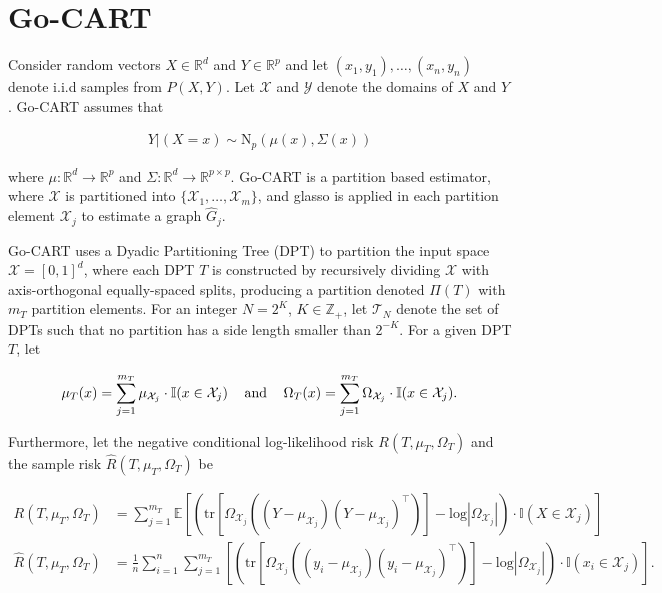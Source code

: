 \documentclass[12pt]{article}
\begin{document}
\section{Go-CART}

Consider random vectors $X \in \mathbb{R}^d$ and $Y \in \mathbb{R}^p$
and let $(x_1,y_1),\ldots,(x_n,y_n)$ denote i.i.d samples from
$P(X,Y)$. Let $\mathcal{X}$ and $\mathcal{Y}$ denote the domains of
$X$ and $Y$. Go-CART assumes that

\begin{align}
    Y|(X=x) \sim \text{N}_p(\mu(x),\Sigma(x))
\end{align}

where $\mu:\mathbb{R}^d \rightarrow \mathbb{R}^p$ and
$\Sigma:\mathbb{R}^d \rightarrow \mathbb{R}^{p \times p}$. Go-CART is
a partition based estimator, where $\mathcal{X}$ is partitioned into
$\{ \mathcal{X}_1,\ldots,\mathcal{X}_m \}$, and glasso is applied in
each partition element $\mathcal{X}_j$ to estimate a graph
$\hat{G}_j$.

Go-CART uses a Dyadic Partitioning Tree (DPT) to partition the input
space $\mathcal{X} = [0,1]^d$, where each DPT $T$ is constructed by
recursively dividing $\mathcal{X}$ with axis-orthogonal equally-spaced
splits, producing a partition denoted $\Pi(T)$ with $m_T$ partition
elements. For an integer $N=2^K$, $K \in \mathbb{Z}_+$, let
$\mathcal{T}_N$ denote the set of DPTs such that no partition has a
side length smaller than $2^{-K}$. For a given DPT $T$, let

\begin{align}
    \mu_T(x) = \sum_{j=1}^{m_T} \mu_{\mathcal{X}_j} \cdot \mathbb{I}(x \in \mathcal{X}_j)
    \hspace{3mm} \text{ and } \hspace{3mm}
    \Omega_T(x) = \sum_{j=1}^{m_T} \Omega_{\mathcal{X}_j} \cdot \mathbb{I}(x \in \mathcal{X}_j).
\end{align}

Furthermore, let the negative conditional log-likelihood risk
$R(T,\mu_T,\Omega_T)$ and the sample risk $\hat{R}(T,\mu_T,\Omega_T)$
be

\begin{align}
    R(T,\mu_T,\Omega_T) &= \sum_{j=1}^{m_T} \mathbb{E} \left[ \left( \text{tr} \left[ \Omega_{\mathcal{X}_j} \left( (Y - \mu_{\mathcal{X}_j})(Y - \mu_{\mathcal{X}_j})^{\top} \right) \right]  - \text{log} |\Omega_{\mathcal{X}_j} | \right)  \cdot \mathbb{I}(X \in \mathcal{X}_j) \right] \\
    \hat{R}(T,\mu_T,\Omega_T) &= \frac{1}{n} \sum_{i=1}^n \sum_{j=1}^{m_T} \left[ \left( \text{tr} \left[ \Omega_{\mathcal{X}_j} \left( (y_i - \mu_{\mathcal{X}_j})(y_i - \mu_{\mathcal{X}_j})^{\top} \right) \right]  - \text{log} |\Omega_{\mathcal{X}_j} | \right)  \cdot \mathbb{I}(x_i \in \mathcal{X}_j) \right].
\end{align}
\end{document}
